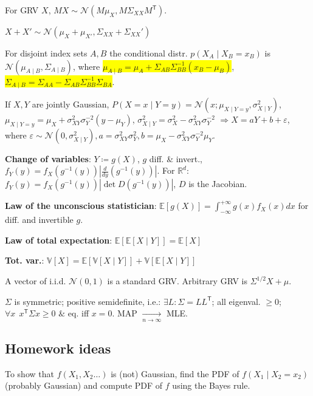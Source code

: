 \documentclass[11pt,landscape,a4paper,fleqn]{article}
\newcommand*{\tran}{^{\mathsf{T}}} %
\newcommand{\mhl}[1]{\setlength{\fboxsep}{0pt}\colorbox{yellow}{#1}}
\begin{document}
\begin{multicols*}{4}
For GRV \(X\), \(MX \sim \mathcal{N}(M\mu_X, M \Sigma_{XX} M\tran)\).

\(X + X' \sim \mathcal{N}(\mu_X + \mu_{X'}, \Sigma_{XX} + \Sigma_{XX}')\)

For disjoint index sets \(A, B\) the conditional distr. \(p(X_A \mid X_B = x_B)\) is \(\mathcal{N}(\mu_{A \mid B}, \Sigma_{A \mid B})\),
where \mhl{\(\mu_{A \mid B} = \mu_A + \Sigma_{AB} \Sigma_{BB}^{-1}(x_B - \mu_B)\)},
\mhl{\(\Sigma_{A \mid B} = \Sigma_{AA} - \Sigma_{AB} \Sigma_{BB}^{-1} \Sigma_{BA}\)}.

If \(X, Y\) are jointly Gaussian, \(P(X = x \mid Y = y) = \mathcal{N}(x; \mu_{X \mid Y = y}, \sigma_{X \mid Y}^2)\),
\(\mu_{X \mid Y = y} = \mu_X + \sigma_{XY}^2 \sigma_Y^{-2} (y - \mu_Y)\),
\(\sigma_{X \mid Y}^2 = \sigma_X^2 - \sigma_{XY}^2 \sigma_Y^{ - 2}\)
\( \Rightarrow X = aY + b + \varepsilon\), where
\(\varepsilon \sim \mathcal{N}(0, \sigma_{X \mid Y}^2), a = \sigma_{XY}^2 \sigma_Y^2, b = \mu_X - \sigma_{XY}^2 \sigma_Y^{-2}\mu_Y\).

\textbf{Change of variables}: \(Y \coloneqq g(X)\), \(g\) diff. \& invert.,
\(f_Y(y) = f_X(g^{-1}(y))|\frac{d}{dy}(g^{-1}(y))|\).
For \(\mathbb{R}^d\): \(f_Y(y) = f_X(g^{-1}(y)) |\det D(g^{-1}(y))|\), \(D\) is the Jacobian.

\textbf{Law of the unconscious statistician}: \(\mathbb{E}[g(X)] = \int_{-\infty}^{+\infty} g(x) f_X(x) dx\)
for diff. and invertible \(g\).

\textbf{Law of total expectation}: \(\mathbb{E}[\mathbb{E}[X \mid Y]] = \mathbb{E}[X]\)

\textbf{Tot. var.}: \(\mathbb{V}[X] = \mathbb{E}[\mathbb{V}[X \mid Y]] + \mathbb{V}[\mathbb{E}[X \mid Y]]\)

A vector of i.i.d. \(\mathcal{N}(0, 1)\) is a standard GRV.
Arbitrary GRV is \(\Sigma^{1 / 2}X + \mu\).

\(\Sigma\) is symmetric; positive semidefinite, i.e.: \(\exists L : \Sigma = L L\tran\);
all eigenval. \(\geq 0\); \(\forall x \ \ x\tran \Sigma x \geq 0\) \(\&\) eq. iff \(x = 0\).
\qquad
MAP \(\xrightarrow[n \to \infty]{}\) MLE.

\subsection{Homework ideas}

To show that \(f(X_1, X_2\dots)\) is (not) Gaussian,
find the PDF of \(f(X_1 \mid X_2 = x_2)\) (probably Gaussian)
and compute PDF of \(f\) using the Bayes rule.


\end{multicols*}
\end{document}
